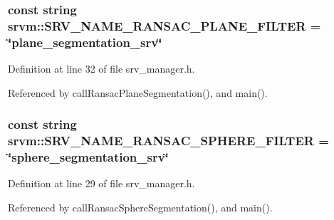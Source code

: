\hypertarget{namespacesrvm_ab0f0109239fb85cfb303e5f44e4534f2}{
\subsubsection[{S\-R\-V\-\_\-\-N\-A\-M\-E\-\_\-\-R\-A\-N\-S\-A\-C\-\_\-\-P\-L\-A\-N\-E\-\_\-\-F\-I\-L\-T\-E\-R}]{\setlength{\rightskip}{0pt plus 5cm}const string srvm\-::\-S\-R\-V\-\_\-\-N\-A\-M\-E\-\_\-\-R\-A\-N\-S\-A\-C\-\_\-\-P\-L\-A\-N\-E\-\_\-\-F\-I\-L\-T\-E\-R = \char`\"{}plane\-\_\-segmentation\-\_\-srv\char`\"{}}}\label{namespacesrvm_ab0f0109239fb85cfb303e5f44e4534f2}


Definition at line 32 of file srv\-\_\-manager.\-h.



Referenced by call\-Ransac\-Plane\-Segmentation(), and main().

\hypertarget{namespacesrvm_affa682d6f49c99cbf55802194970b5e5}{
\subsubsection[{S\-R\-V\-\_\-\-N\-A\-M\-E\-\_\-\-R\-A\-N\-S\-A\-C\-\_\-\-S\-P\-H\-E\-R\-E\-\_\-\-F\-I\-L\-T\-E\-R}]{\setlength{\rightskip}{0pt plus 5cm}const string srvm\-::\-S\-R\-V\-\_\-\-N\-A\-M\-E\-\_\-\-R\-A\-N\-S\-A\-C\-\_\-\-S\-P\-H\-E\-R\-E\-\_\-\-F\-I\-L\-T\-E\-R = \char`\"{}sphere\-\_\-segmentation\-\_\-srv\char`\"{}}}\label{namespacesrvm_affa682d6f49c99cbf55802194970b5e5}


Definition at line 29 of file srv\-\_\-manager.\-h.



Referenced by call\-Ransac\-Sphere\-Segmentation(), and main().

